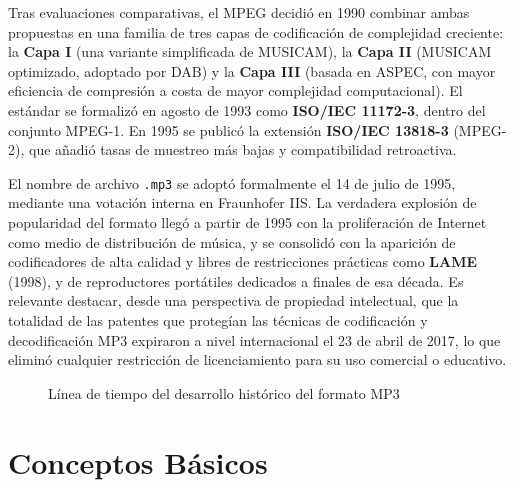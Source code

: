 \documentclass[pdflatex,sn-mathphys-num]{sn-jnl}%
\begin{document}
Tras evaluaciones comparativas, el MPEG decidió en 1990 combinar ambas propuestas en una familia de tres capas de codificación de complejidad creciente: la \textbf{Capa I} (una variante simplificada de MUSICAM), la \textbf{Capa II} (MUSICAM optimizado, adoptado por DAB) y la \textbf{Capa III} (basada en ASPEC, con mayor eficiencia de compresión a costa de mayor complejidad computacional). El estándar se formalizó en agosto de 1993 como \textbf{ISO/IEC 11172-3}, dentro del conjunto MPEG-1. En 1995 se publicó la extensión \textbf{ISO/IEC 13818-3} (MPEG-2), que añadió tasas de muestreo más bajas y compatibilidad retroactiva.

El nombre de archivo \texttt{.mp3} se adoptó formalmente el 14 de julio de 1995, mediante una votación interna en Fraunhofer IIS. La verdadera explosión de popularidad del formato llegó a partir de 1995 con la proliferación de Internet como medio de distribución de música, y se consolidó con la aparición de codificadores de alta calidad y libres de restricciones prácticas como \textbf{LAME} (1998), y de reproductores portátiles dedicados a finales de esa década. Es relevante destacar, desde una perspectiva de propiedad intelectual, que la totalidad de las patentes que protegían las técnicas de codificación y decodificación MP3 expiraron a nivel internacional el 23 de abril de 2017, lo que eliminó cualquier restricción de licenciamiento para su uso comercial o educativo.

\begin{figure}[!h]
    \centering
    \caption{Línea de tiempo del desarrollo histórico del formato MP3}
    \label{fig:timeline}
\end{figure}

\section{Conceptos Básicos}\label{sec:basics}
\end{document}
